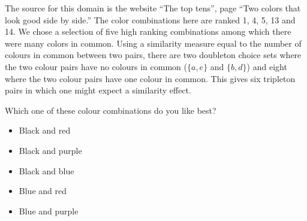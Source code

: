 The source for this domain is the website ``The top tens'', page ``Two colors that look good side by side.''
The color combinations here are ranked 1, 4, 5, 13 and 14.
We chose a selection of five high ranking combinations among which there were many colors
in common.
Using a similarity measure equal to the number of colours in common between two pairs, there are two doubleton choice sets where the two colour pairs have no colours in common ($\{a,e\}$ and $\{b,d\}$) and eight where the two colour pairs have one colour in common.
This gives six tripleton pairs in which one might expect a similarity effect.

\begin{tcolorbox}
Which one of these colour combinations do you like best?

\begin{itemize}
	\setlength\itemsep{-5pt}
	\item Black and red
	\item Black and purple
	\item Black and blue
	\item Blue and red
	\item Blue and purple
\end{itemize}
\end{tcolorbox}
